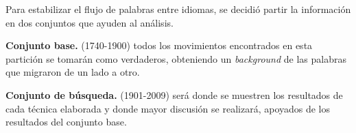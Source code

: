 Para estabilizar el flujo de palabras entre idiomas, se decidió partir la
información en dos conjuntos que ayuden al análisis.

\textbf{Conjunto base.} (1740-1900) todos los movimientos encontrados en esta
partición se tomarán como verdaderos,  obteniendo un \textit{background} de
las palabras que migraron de un lado a otro.

\textbf{Conjunto de búsqueda.} (1901-2009) será donde se muestren los
resultados de cada técnica elaborada y donde mayor discusión se realizará,
apoyados de los resultados del conjunto base. 

